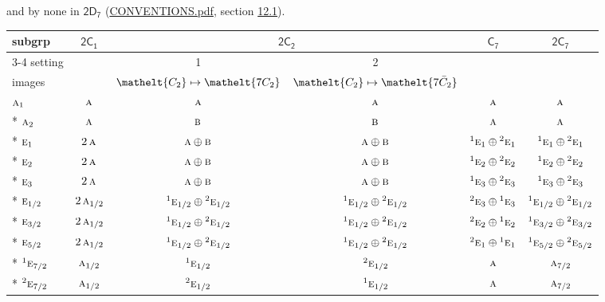 \documentclass[10pt,a4paper]{article}
\numberwithin{equation}{section}
\newcommand{\eltfont}[1]{{\let\sigma\eltsigma\mathelt{#1}}}
\newcommand{\grp}[1]{\mathsf{#1}}
\newcommand{\irr}[1]{\text{\normalfont\scshape #1}}
\newcommand{\conjpair}[1]{{}^{#1}}
\newcommand{\cls}[1]{\eltfont{#1}}
\newcommand{\barred}[1]{\bar{#1}}
\begin{document}
and by none in $\grp{2D_{7}}$ (\href{../../CONVENTIONS.pdf}{CONVENTIONS.pdf}, section \href{../../../rotation/CONVENTIONS.pdf\#conv.12.1}{12.1}).
{\small\begin{longtable}{@{}lccccc@{}}\toprule
subgrp & \href{2C1.pdf}{$\grp{2C_{1}}$} & \multicolumn{2}{c}{\href{2C2.pdf}{$\grp{2C_{2}}$}} & \href{C7.pdf}{$\grp{C_{7}}$} & \href{2C7.pdf}{$\grp{2C_{7}}$}\\\cmidrule(lr){3-4}
setting &  & 1 & 2 &  & \\
images &  & {\scriptsize $\cls{C_{2}} \mapsto \cls{7C_{2}}$} & {\scriptsize $\cls{C_{2}} \mapsto \cls{7\barred{C}_{2}}$} &  & \\\midrule\endhead
\bottomrule\endfoot\endlastfoot
$\irr{a}_{1}$ & $\irr{a}$ & $\irr{a}$ & $\irr{a}$ & $\irr{a}$ & $\irr{a}$\\*
$\irr{a}_{2}$ & $\irr{a}$ & $\irr{b}$ & $\irr{b}$ & $\irr{a}$ & $\irr{a}$\\*
$\irr{e}_{1}$ & $2\,\irr{a}$ & $\irr{a}\oplus \irr{b}$ & $\irr{a}\oplus \irr{b}$ & $\conjpair{1}\irr{e}_{1}\oplus \conjpair{2}\irr{e}_{1}$ & $\conjpair{1}\irr{e}_{1}\oplus \conjpair{2}\irr{e}_{1}$\\*
$\irr{e}_{2}$ & $2\,\irr{a}$ & $\irr{a}\oplus \irr{b}$ & $\irr{a}\oplus \irr{b}$ & $\conjpair{1}\irr{e}_{2}\oplus \conjpair{2}\irr{e}_{2}$ & $\conjpair{1}\irr{e}_{2}\oplus \conjpair{2}\irr{e}_{2}$\\*
$\irr{e}_{3}$ & $2\,\irr{a}$ & $\irr{a}\oplus \irr{b}$ & $\irr{a}\oplus \irr{b}$ & $\conjpair{1}\irr{e}_{3}\oplus \conjpair{2}\irr{e}_{3}$ & $\conjpair{1}\irr{e}_{3}\oplus \conjpair{2}\irr{e}_{3}$\\*
$\irr{e}_{1/2}$ & $2\,\irr{a}_{1/2}$ & $\conjpair{1}\irr{e}_{1/2}\oplus \conjpair{2}\irr{e}_{1/2}$ & $\conjpair{1}\irr{e}_{1/2}\oplus \conjpair{2}\irr{e}_{1/2}$ & $\conjpair{2}\irr{e}_{3}\oplus \conjpair{1}\irr{e}_{3}$ & $\conjpair{1}\irr{e}_{1/2}\oplus \conjpair{2}\irr{e}_{1/2}$\\*
$\irr{e}_{3/2}$ & $2\,\irr{a}_{1/2}$ & $\conjpair{1}\irr{e}_{1/2}\oplus \conjpair{2}\irr{e}_{1/2}$ & $\conjpair{1}\irr{e}_{1/2}\oplus \conjpair{2}\irr{e}_{1/2}$ & $\conjpair{2}\irr{e}_{2}\oplus \conjpair{1}\irr{e}_{2}$ & $\conjpair{1}\irr{e}_{3/2}\oplus \conjpair{2}\irr{e}_{3/2}$\\*
$\irr{e}_{5/2}$ & $2\,\irr{a}_{1/2}$ & $\conjpair{1}\irr{e}_{1/2}\oplus \conjpair{2}\irr{e}_{1/2}$ & $\conjpair{1}\irr{e}_{1/2}\oplus \conjpair{2}\irr{e}_{1/2}$ & $\conjpair{2}\irr{e}_{1}\oplus \conjpair{1}\irr{e}_{1}$ & $\conjpair{1}\irr{e}_{5/2}\oplus \conjpair{2}\irr{e}_{5/2}$\\*
$\conjpair{1}\irr{e}_{7/2}$ & $\irr{a}_{1/2}$ & $\conjpair{1}\irr{e}_{1/2}$ & $\conjpair{2}\irr{e}_{1/2}$ & $\irr{a}$ & $\irr{a}_{7/2}$\\*
$\conjpair{2}\irr{e}_{7/2}$ & $\irr{a}_{1/2}$ & $\conjpair{2}\irr{e}_{1/2}$ & $\conjpair{1}\irr{e}_{1/2}$ & $\irr{a}$ & $\irr{a}_{7/2}$\\
\bottomrule\end{longtable}}
\end{document}
